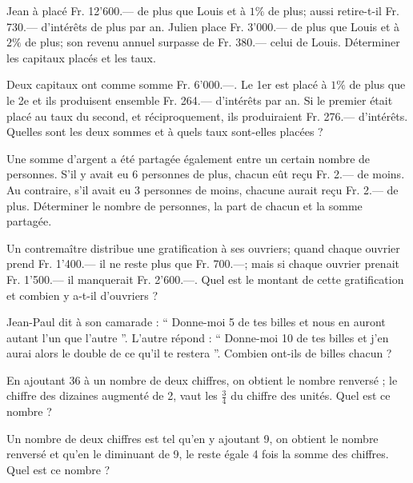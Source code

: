 \begin{exercice}
Jean à placé Fr. 12’600.— de plus que Louis et à $1 \%$ de plus; aussi retire-t-il Fr. 730.— d’intérêts de plus par an. Julien place Fr. 3’000.— de plus que Louis et à $2 \%$ de plus; son revenu annuel surpasse de Fr. 380.— celui de Louis. Déterminer les capitaux placés et les taux.
\end{exercice}

\begin{exercice}
Deux capitaux ont comme somme Fr. 6’000.—. Le 1er est placé à $1 \%$ de plus que le 2e et ils produisent ensemble Fr. 264.— d’intérêts par an. Si le premier était placé au taux du second, et réciproquement, ils produiraient Fr. 276.— d’intérêts. Quelles sont les deux sommes et à quels taux sont-elles placées ?
\end{exercice}

\begin{exercice}
Une somme d’argent a été partagée également entre un certain nombre de personnes. S’il y avait eu 6 personnes de plus, chacun eût reçu Fr. 2.— de moins. Au contraire, s’il avait eu 3 personnes de moins, chacune aurait reçu Fr. 2.— de plus. Déterminer le nombre de personnes, la part de chacun et la somme partagée.
\end{exercice}

\begin{exercice}
Un contremaître distribue une gratification à ses ouvriers; quand chaque ouvrier prend Fr. 1’400.— il ne reste plus que Fr. 700.—; mais si chaque ouvrier prenait Fr. 1’500.— il manquerait Fr. 2’600.—. Quel est le montant de cette gratification et combien y a-t-il d’ouvriers ?
\end{exercice}

\begin{exercice}
Jean-Paul dit à son camarade : “ Donne-moi 5 de tes billes et nous en auront autant l’un que l’autre ”. L’autre répond : “ Donne-moi 10 de tes billes et j’en aurai alors le double de ce qu’il te restera ”. Combien ont-ils de billes chacun ?
\end{exercice}

\begin{exercice}
En ajoutant 36 à un nombre de deux chiffres, on obtient le nombre renversé ; le chiffre des dizaines augmenté de 2, vaut les $\frac{3}{4}$ du chiffre des unités. Quel est ce nombre ?
\end{exercice}

\begin{exercice}
Un nombre de deux chiffres est tel qu’en y ajoutant 9, on obtient le nombre renversé et qu’en le diminuant de 9, le reste égale 4 fois la somme des chiffres. Quel est ce nombre ?
\end{exercice}

